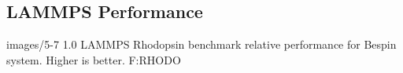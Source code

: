 





\subsection{LAMMPS Performance}

  {images/5-7}
  {1.0}
  {LAMMPS Rhodopsin benchmark relative performance for Bespin system.  Higher is better.}
  {F:RHODO} 


